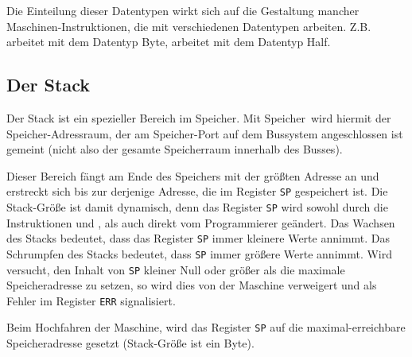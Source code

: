 Die Einteilung dieser Datentypen wirkt sich auf die Gestaltung mancher
Maschinen-Instruktionen, die mit verschiedenen Datentypen arbeiten.
Z.B.  arbeitet mit dem Datentyp \glqq Byte\grqq, 
arbeitet mit dem Datentyp \glqq Half\grqq.



\subsection{Der Stack}
\label{subsec:Stack}

Der Stack ist ein spezieller Bereich im Speicher. Mit \glqq Speicher\grqq\ wird
hiermit der Speicher-Adressraum, der am Speicher-Port auf dem Bussystem
angeschlossen ist gemeint (nicht also der gesamte Speicherraum innerhalb des Busses).

Dieser Bereich fängt am Ende des Speichers mit der größten Adresse an und
erstreckt sich bis zur derjenige Adresse, die im Register \texttt{SP}
gespeichert ist. Die Stack-Größe ist damit dynamisch, denn das Register
\texttt{SP} wird sowohl durch die Instruktionen  und  , als
auch direkt vom Programmierer geändert.
Das Wachsen
des Stacks bedeutet, dass das Register \texttt{SP} immer kleinere Werte annimmt.
Das Schrumpfen
des Stacks bedeutet, dass \texttt{SP} immer größere Werte annimmt. 
Wird versucht, den Inhalt von \texttt{SP} kleiner Null oder größer als die
maximale Speicheradresse zu setzen, so wird dies von der Maschine verweigert und
als Fehler im Register \texttt{ERR} signalisiert.

Beim Hochfahren der Maschine, wird das Register \texttt{SP} auf die
maximal-erreichbare Speicheradresse gesetzt (Stack-Größe ist ein Byte).


